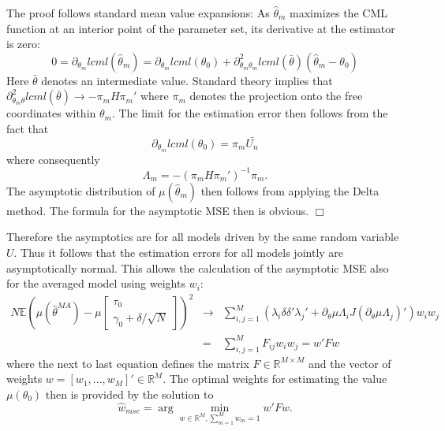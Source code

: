 \documentclass[12pt, a4paper]{article}
\newenvironment{proof}{{\tt PROOF:}}{$\Box$\\}
\numberwithin{defcounter}{section}
\numberwithin{excounter}{section}
\begin{document}
\begin{proof}
The proof follows standard mean value expansions: 
As $\hat \theta_m$ maximizes the CML function at an interior point of 
the parameter set, its derivative at the estimator is zero:
%
$$
0 = \partial_{\theta_m} lcml(\hat \theta_m) = 
\partial_{\theta_m} lcml(\theta_0) + 
\partial_{\theta_m \theta_m}^2 lcml(\bar \theta) ( \hat \theta_m - \theta_0)
$$
%
Here $\bar\theta$ denotes an intermediate value. Standard theory implies that $\partial_{\theta_m \theta}^2 lcml(\bar \theta) \to -\pi_m H \pi_m'$ where $\pi_m$ denotes the projection onto the free coordinates within $\theta_m$.
The limit for the estimation error then follows from the fact that 
%
$$
\partial_{\theta_m} lcml(\theta_0) = \pi_m \bar{U_n}
$$
%
where consequently
%
$$
\Lambda_m = -(\pi_m H \pi_m')^{-1} \pi_m.
$$
%
The asymptotic distribution of $\mu(\hat \theta_m)$ then follows from 
applying the Delta method. The formula for the asymptotic MSE then is obvious. 
\end{proof}


Therefore the asymptotics are for all models 
driven by the same random variable $U$. Thus it follows that the estimation errors for all models 
jointly are asymptotically normal. This allows the calculation of the 
asymptotic MSE also for the averaged model using weights $w_i$: 
%
\begin{eqnarray} \label{eq:MSE} 
N {\mathbb E} \left(\mu(\hat \theta^{MA})
-\mu  \left[ \begin{array}{c} \tau_0 \\ \gamma_0 + \delta/\sqrt{N} \end{array} \right] \right)^2 & \to &
\sum_{i,j =1}^M (\lambda_i  \delta \delta' 
\lambda_j ' + \partial_\theta\mu \Lambda_i J 
(\partial_\theta\mu \Lambda_j)')  w_i w_j \nonumber \\
& = & \sum_{i,j =1}^M F_{ij} w_i w_j = w'F w
\end{eqnarray} 
%
where the next to last equation defines the matrix $F \in {\mathbb R}^{M \times M}$ and the vector of weights $w = [w_1,...,w_M]' \in {\mathbb R}^{M}$. 
The optimal weights for estimating the value $\mu(\theta_0)$ then is provided by the solution to 
%
\begin{equation}
\label{eq:weights}
\hat{w}_{mse} = \arg \min_{w  \in {\mathbb R}^{M}, \sum_{m=1}^M w_m = 1} w'Fw.
\end{equation}
\end{document}
